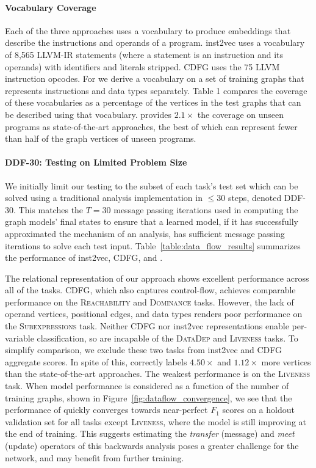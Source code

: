 \paragraph{Vocabulary Coverage} Each of the three approaches uses a vocabulary
to produce embeddings that describe the instructions and operands of a program.
inst2vec uses a vocabulary of 8,565 LLVM-IR statements (where a statement is an
instruction and its operands) with identifiers and literals stripped.  CDFG uses
the 75 LLVM instruction opcodes. For \programl we derive a vocabulary on a set
of training graphs that represents instructions and data types separately. Table
1 compares the coverage of these vocabularies as a percentage of the vertices in
the test graphs that can be described using that vocabulary.  \programl provides
$2.1\times$ the coverage on unseen programs as state-of-the-art approaches, the
best of which can represent fewer than half of the graph vertices of unseen
programs.

\paragraph{DDF-30: Testing on Limited Problem Size} We initially limit our
testing to the subset of each task's test set which can be solved using a
traditional analysis implementation in $\le 30$ steps, denoted DDF-30. This
matches the $T = 30$ message passing iterations used in computing the graph
models' final states to ensure that a learned model, if it has successfully
approximated the mechanism of an analysis, has sufficient message passing
iterations to solve each test input. Table~\ref{table:data_flow_results}
summarizes the performance of inst2vec, CDFG, and \programl.

The relational representation of our approach shows excellent performance across
all of the tasks. CDFG, which also captures control-flow, achieves comparable
performance on the \textsc{Reachability} and \textsc{Dominance} tasks. However,
the lack of operand vertices, positional edges, and data types renders poor
performance on the \textsc{Subexpressions} task. Neither CDFG nor inst2vec
representations enable per-variable classification, so are incapable of the
\textsc{DataDep} and \textsc{Liveness} tasks. To simplify comparison, we exclude
these two tasks from inst2vec and CDFG aggregate scores. In spite of this,
\programl correctly labels  $4.50\times$ and $1.12\times$ more vertices than the
state-of-the-art approaches. The weakest \programl performance is on the
\textsc{Liveness} task. When model performance is considered as a function of
the number of training graphs, shown in Figure~\ref{fig:dataflow_convergence},
we see that the performance of \programl quickly converges towards near-perfect
$F_1$ scores on a holdout validation set for all tasks except \textsc{Liveness},
where the model is still improving at the end of training. This suggests
estimating the \emph{transfer} (message) and \emph{meet} (update) operators of
this backwards analysis poses a greater challenge for the network, and may
benefit from further training.

